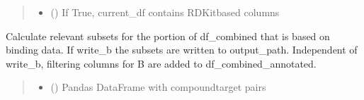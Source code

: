 \documentclass[letterpaper,10pt,english]{sphinxmanual}
\begin{document}
\begin{fulllineitems}
\begin{quote}
\begin{description}
\begin{itemize}
\item {} 
\sphinxAtStartPar
{} () \textendash{} If True, current\_df contains RDKit\sphinxhyphen{}based columns

\end{itemize}

\end{description}\end{quote}

\end{fulllineitems}


\begin{fulllineitems}
\label{\detokenize{write_subsets:write_subsets.write_b_to_file}}
\pysigstartsignatures
{}
\pysigstopsignatures
\sphinxAtStartPar
Calculate relevant subsets for the portion of df\_combined that is based on binding data.
If write\_b the subsets are written to output\_path.
Independent of write\_b, filtering columns for B are added to df\_combined\_annotated.
\begin{quote}\begin{description}
\begin{itemize}
\item {} 
\sphinxAtStartPar
{} () \textendash{} Pandas DataFrame with compound\sphinxhyphen{}target pairs


\end{itemize}
\end{description}
\end{quote}
\end{fulllineitems}
\end{document}
